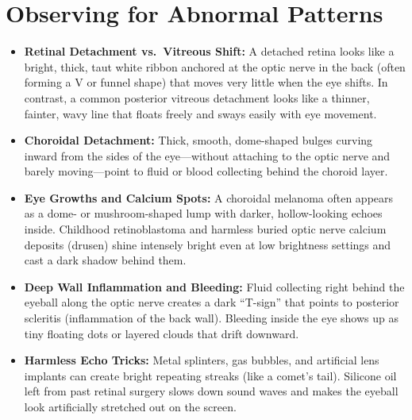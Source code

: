 \section{Observing for Abnormal Patterns}
\begin{itemize}
    \item \textbf{Retinal Detachment vs.\ Vitreous Shift:} A detached retina looks like a bright, thick, taut white ribbon anchored at the optic nerve in the back (often forming a V or funnel shape) that moves very little when the eye shifts. In contrast, a common posterior vitreous detachment looks like a thinner, fainter, wavy line that floats freely and sways easily with eye movement.
    \item \textbf{Choroidal Detachment:} Thick, smooth, dome-shaped bulges curving inward from the sides of the eye---without attaching to the optic nerve and barely moving---point to fluid or blood collecting behind the choroid layer.
    \item \textbf{Eye Growths and Calcium Spots:} A choroidal melanoma often appears as a dome- or mushroom-shaped lump with darker, hollow-looking echoes inside. Childhood retinoblastoma and harmless buried optic nerve calcium deposits (drusen) shine intensely bright even at low brightness settings and cast a dark shadow behind them.
    \item \textbf{Deep Wall Inflammation and Bleeding:} Fluid collecting right behind the eyeball along the optic nerve creates a dark ``T-sign'' that points to posterior scleritis (inflammation of the back wall). Bleeding inside the eye shows up as tiny floating dots or layered clouds that drift downward.
    \item \textbf{Harmless Echo Tricks:} Metal splinters, gas bubbles, and artificial lens implants can create bright repeating streaks (like a comet's tail). Silicone oil left from past retinal surgery slows down sound waves and makes the eyeball look artificially stretched out on the screen.
\end{itemize}


